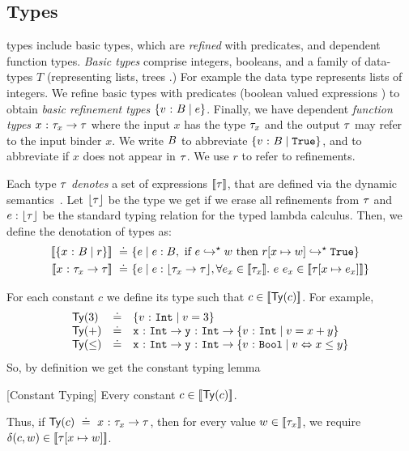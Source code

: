 

\subsection{Types}

\corelan types include basic types, which are \emph{refined} with predicates,
and dependent function types.
%
\emph{Basic types} \btyp comprise integers, booleans, and a family of data-types
$T$ (representing lists, trees \etc.)
%
For example the data type \tintlist represents lists of integers.
%
We refine basic types with predicates (boolean valued expressions ) to obtain
\emph{basic refinement types} $\{ {v} \ \text{:}\ {B} \mid e \}$.
%
Finally, we have dependent \emph{function types} ${x} \ \text{:}\ {\tau_x} \rightarrow \tau$
where the input $x$ has the type $\tau_x$ and the output $\tau$ may
refer to the input binder $x$.
%
We write $B$ to abbreviate $\{ {v} \ \text{:}\ {B} \mid \mathtt{True} \}$,
and  to abbreviate  if
$x$ does not appear in $\tau$.
%
We use $r$ to refer to refinements.


%
Each type $\tau$ \emph{denotes} a set of expressions $[\![\tau]\!]$,
that are defined via the dynamic semantics~\cite{Knowles10}.
%
Let $\lfloor \tau \rfloor$ be the type we get if we erase all refinements
from $\tau$ and $e : \lfloor \tau \rfloor$ be the
standard typing relation for the typed lambda calculus.
%
Then, we define the denotation of types as:
\begin{align*}
\interp{\tref{x}{\btyp}{r}} \defeq &
    \{e \mid  \bhastype{}{e}{\btyp},
              \mbox{ if } \evalsto{e}{w}
              \mbox{ then } \evalsto{r\subst{x}{w}}{\etrue} \}\\
\interp{\tfun{x}{\typ_x}{\typ}} \defeq &
    \{e \mid  \bhastype{}{e}{\shape{\tfunbasic{\typ_x}{\typ}}},
              \forall e_x \in \interp{\typ_x}.\ \eapp{e}{e_x} \in \interp{\typ\subst{x}{e_x}}
    \}
\end{align*}


For each constant $c$ we define its type 
such that $c \in [\![\mathsf{Ty}({c})]\!]$.
%
For example,
%
$$
\begin{array}{lcl}
\mathsf{Ty}({3}) &\doteq& \{ {v} \ \text{:}\ {\mathtt{Int}} \mid v = 3 \}\\
\mathsf{Ty}({+}) &\doteq& {\mathtt{x}} \ \text{:}\ {\mathtt{Int}} \rightarrow {\mathtt{y}} \ \text{:}\ {\mathtt{Int}} \rightarrow \{ {v} \ \text{:}\ {\mathtt{Int}} \mid v = x + y \}\\
\mathsf{Ty}({\leq}) &\doteq& {\mathtt{x}} \ \text{:}\ {\mathtt{Int}} \rightarrow {\mathtt{y}} \ \text{:}\ {\mathtt{Int}} \rightarrow \{ {v} \ \text{:}\ {\mathtt{Bool}} \mid v \Leftrightarrow x \leq y \}\\
\end{array}
$$
%
So, by definition we get the constant typing lemma
%
\begin{lemma}{[Constant Typing]}\label{lemma:constants}
Every constant $c \in [\![\mathsf{Ty}({c})]\!]$.
\end{lemma}
%
Thus, if $\mathsf{Ty}({c}) \ \doteq\  {x} \ \text{:}\ {\tau_x} \rightarrow \tau$,
then for every value $w \in [\![\tau_x]\!]$, we require
$\delta(c, w) \in [\![\tau[{{x} \mapsto {w}}]]\!]$.

